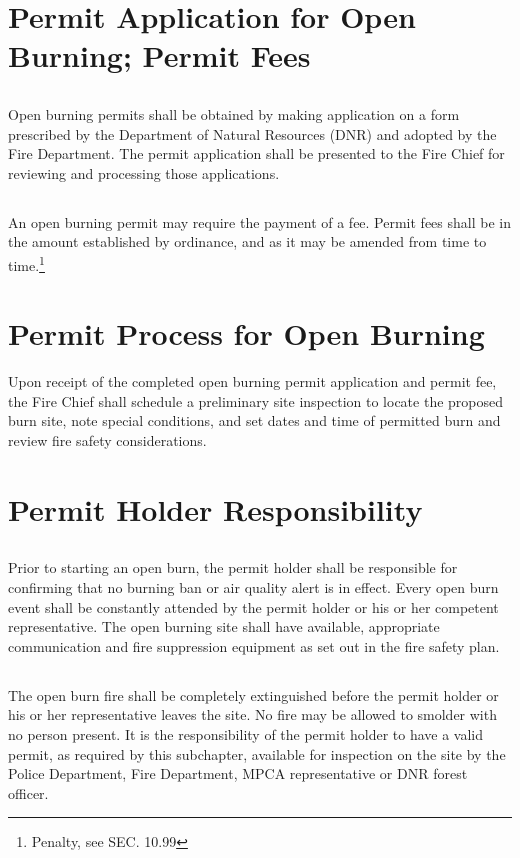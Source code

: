 \section{Permit Application for Open Burning; Permit Fees}
\subsection{}
Open burning permits shall be obtained by making application on a form prescribed by the Department of Natural Resources (DNR) and adopted by the Fire Department.  The permit application shall be presented to the Fire Chief for reviewing and processing those applications.
\subsection{}
An open burning permit may require the payment of a fee.  Permit fees shall be in the amount established by ordinance, and as it may be amended from time to time.\footnote{Penalty, see SEC. 10.99}
\section{Permit Process for Open Burning}
Upon receipt of the completed open burning permit application and permit fee, the Fire Chief shall schedule a preliminary site inspection to locate the proposed burn site, note special conditions, and set dates and time of permitted burn and review fire safety considerations.
\section{Permit Holder Responsibility}
\subsection{}
Prior to starting an open burn, the permit holder shall be responsible for confirming that no burning ban or air quality alert is in effect.  Every open burn event shall be constantly attended by the permit holder or his or her competent representative.  The open burning site shall have available, appropriate communication and fire suppression equipment as set out in the fire safety plan.
\subsection{}
The open burn fire shall be completely extinguished before the permit holder or his or her representative leaves the site.  No fire may be allowed to smolder with no person present.  It is the responsibility of the permit holder to have a valid permit, as required by this subchapter, available for inspection on the site by the Police Department, Fire Department, MPCA representative or DNR forest officer.
